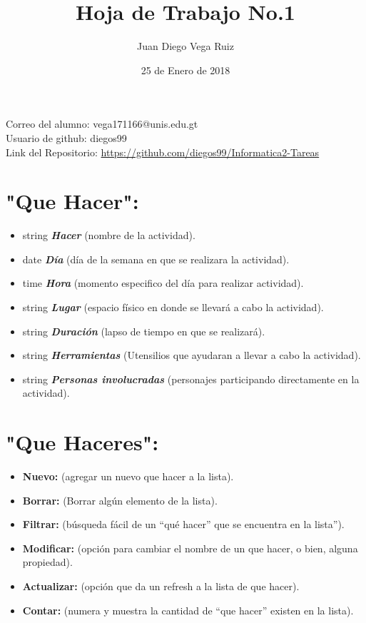 \documentclass[12pt, a4paper]{article}
\author{Juan Diego Vega Ruiz}
\date{25 de Enero de 2018}
\begin{document}
 
  \title{Hoja de Trabajo No.1} 
   \maketitle    
   Correo del alumno: vega171166@unis.edu.gt \\   
   Usuario de github: diegos99 \\
   Link del Repositorio: \href{https://github.com/diegos99/Informatica2-Tareas}{https://github.com/diegos99/Informatica2-Tareas}


    \section{"Que Hacer":}
        \begin{itemize}
            \item string \textbf{\emph{Hacer}} (nombre de la actividad).
            \item date \textbf{\emph{Día}} (día de la semana en que se realizara la actividad).
            \item time \textbf{\emph{Hora}} (momento especifico del día para realizar actividad).
            \item string \textbf{\emph{Lugar}} (espacio físico en donde se llevará a cabo la actividad).
            \item string \textbf{\emph{Duración}} (lapso de tiempo en que se realizará).
            \item string \textbf{\emph{Herramientas}} (Utensilios que ayudaran a llevar a cabo la actividad).
            \item string \textbf{\emph{Personas involucradas}} (personajes participando directamente en la actividad).
        \end{itemize}
    \section{"Que Haceres":}
        \begin{itemize}
            \item \textbf{Nuevo:} (agregar un nuevo que hacer a la lista).
            \item \textbf{Borrar:} (Borrar algún elemento de la lista).
            \item \textbf{Filtrar:} (búsqueda fácil de un “qué hacer” que se encuentra en la lista”).
            \item \textbf{Modificar:} (opción para cambiar el nombre de un que hacer, o bien, alguna propiedad).
            \item \textbf{Actualizar:} (opción que da un refresh a la lista de que hacer).
            \item \textbf{Contar:} (numera y muestra la cantidad de “que hacer” existen en la lista).       
        \end{itemize}
        
\end{document}
